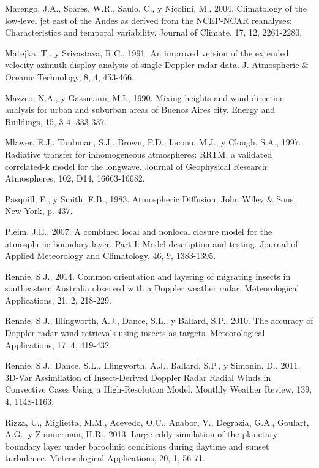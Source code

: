 \documentclass[12pt,spanish,oneside, a4paper]{book}
\begin{document}
\hypertarget{ref-Marengo2004}{}
Marengo, J.A., Soares, W.R., Saulo, C., y Nicolini, M., 2004.
Climatology of the low-level jet east of the Andes as derived from the
NCEP-NCAR reanalyses: Characteristics and temporal variability. Journal
of Climate, 17, 12, 2261-2280.

\hypertarget{ref-Matejka1991}{}
Matejka, T., y Srivastava, R.C., 1991. An improved version of the
extended velocity-azimuth display analysis of single-Doppler radar data.
J. Atmospheric \& Oceanic Technology, 8, 4, 453-466.

\hypertarget{ref-Mazzeo1990}{}
Mazzeo, N.A., y Gassmann, M.I., 1990. Mixing heights and wind direction
analysis for urban and suburban areas of Buenos Aires city. Energy and
Buildings, 15, 3-4, 333-337.

\hypertarget{ref-Mlawer1997}{}
Mlawer, E.J., Taubman, S.J., Brown, P.D., Iacono, M.J., y Clough, S.A.,
1997. Radiative transfer for inhomogeneous atmospheres: RRTM, a
validated correlated-k model for the longwave. Journal of Geophysical
Research: Atmospheres, 102, D14, 16663-16682.

\hypertarget{ref-Pasquill1983}{}
Pasquill, F., y Smith, F.B., 1983. Atmospheric Diffusion, John Wiley \&
Sons, New York, p. 437.

\hypertarget{ref-Pleim2007}{}
Pleim, J.E., 2007. A combined local and nonlocal closure model for the
atmospheric boundary layer. Part I: Model description and testing.
Journal of Applied Meteorology and Climatology, 46, 9, 1383-1395.

\hypertarget{ref-Rennie2014}{}
Rennie, S.J., 2014. Common orientation and layering of migrating insects
in southeastern Australia observed with a Doppler weather radar.
Meteorological Applications, 21, 2, 218-229.

\hypertarget{ref-Rennie2010}{}
Rennie, S.J., Illingworth, A.J., Dance, S.L., y Ballard, S.P., 2010. The
accuracy of Doppler radar wind retrievals using insects as targets.
Meteorological Applications, 17, 4, 419-432.

\hypertarget{ref-Rennie2011}{}
Rennie, S.J., Dance, S.L., Illingworth, A.J., Ballard, S.P., y Simonin,
D., 2011. 3D-Var Assimilation of Insect-Derived Doppler Radar Radial
Winds in Convective Cases Using a High-Resolution Model. Monthly Weather
Review, 139, 4, 1148-1163.

\hypertarget{ref-Rizza2013}{}
Rizza, U., Miglietta, M.M., Acevedo, O.C., Anabor, V., Degrazia, G.A.,
Goulart, A.G., y Zimmerman, H.R., 2013. Large-eddy simulation of the
planetary boundary layer under baroclinic conditions during daytime and
sunset turbulence. Meteorological Applications, 20, 1, 56-71.
\end{document}
